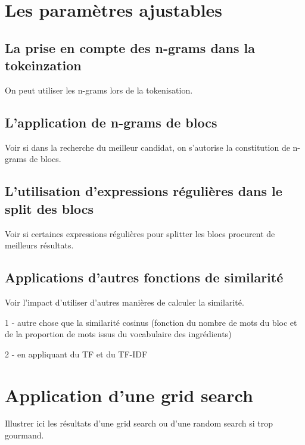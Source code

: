         \section{Les paramètres ajustables}

            \subsection{La prise en compte des \og n-grams \fg dans la tokeinzation}

            On peut utiliser les n-grams lors de la tokenisation.

            \subsection{L'application de \og n-grams \fg de blocs}

            Voir si dans la recherche du meilleur candidat, on s'autorise la constitution de \og n-grams \fg de blocs.

            \subsection{L'utilisation d'expressions régulières dans le split des blocs}

            Voir si certaines expressions régulières pour splitter les blocs procurent de meilleurs résultats.

            \subsection{Applications d'autres fonctions de similarité}

            Voir l'impact d'utiliser d'autres manières de calculer la similarité.

            1 - autre chose que la similarité cosinus (fonction du nombre de mots du bloc et de la proportion de mots issus du vocabulaire des ingrédients)

            2 - en appliquant du TF et du TF-IDF

        \section{Application d'une grid search}

        Illustrer ici les résultats d'une grid search ou d'une random search si trop gourmand.